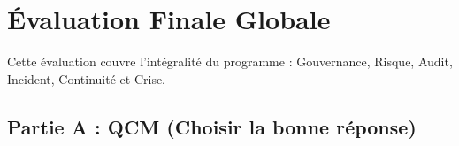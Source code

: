 \chapter{Évaluation Finale Globale}
\label{chap:evalfinale}

Cette évaluation couvre l'intégralité du programme : Gouvernance, Risque, Audit, Incident, Continuité et Crise.

\section{Partie A : QCM (Choisir la bonne réponse)}

